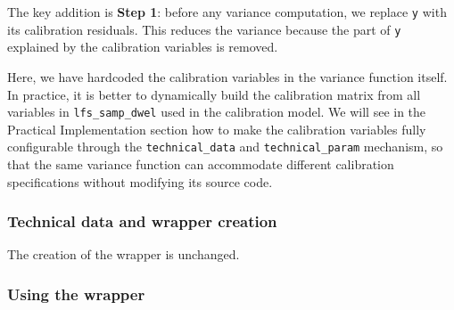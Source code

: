\documentclass[
]{article}
\newenvironment{Shaded}{\begin{snugshade}}{\end{snugshade}}
\newcommand{\AttributeTok}[1]{\textcolor[rgb]{0.13,0.29,0.53}{#1}}
\newcommand{\FunctionTok}[1]{\textcolor[rgb]{0.13,0.29,0.53}{\textbf{#1}}}
\newcommand{\NormalTok}[1]{#1}
\newcommand{\OtherTok}[1]{\textcolor[rgb]{0.56,0.35,0.01}{#1}}
\newcommand{\SpecialCharTok}[1]{\textcolor[rgb]{0.81,0.36,0.00}{\textbf{#1}}}
\newcommand{\StringTok}[1]{\textcolor[rgb]{0.31,0.60,0.02}{#1}}
\begin{document}
The key addition is \textbf{Step 1}: before any variance computation, we
replace \texttt{y} with its calibration residuals. This reduces the
variance because the part of \texttt{y} explained by the calibration
variables is removed.

Here, we have hardcoded the calibration variables in the variance
function itself. In practice, it is better to dynamically build the
calibration matrix from all variables in \texttt{lfs\_samp\_dwel} used
in the calibration model. We will see in the Practical Implementation
section how to make the calibration variables fully configurable through
the \texttt{technical\_data} and \texttt{technical\_param} mechanism, so
that the same variance function can accommodate different calibration
specifications without modifying its source code.

\subsubsection{Technical data and wrapper
creation}\label{technical-data-and-wrapper-creation-1}

The creation of the wrapper is unchanged.

\begin{Shaded}
\end{Shaded}

\subsubsection{Using the wrapper}\label{using-the-wrapper-2}
\end{document}
